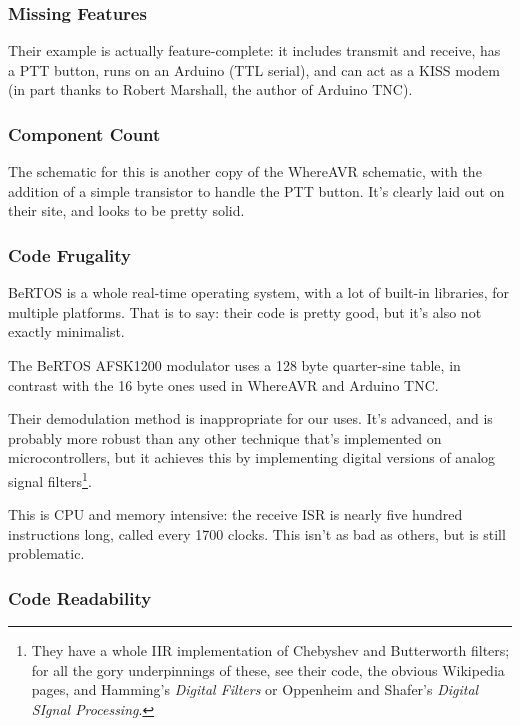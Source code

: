 \documentclass{article}
\begin{document}
\subsubsection{Missing Features}

Their example is actually feature-complete: it includes transmit and
receive, has a PTT button, runs on an Arduino (TTL serial), and can
act as a KISS modem (in part thanks to Robert Marshall, the author of
Arduino TNC).


\subsubsection{Component Count}

The schematic for this is another copy of the WhereAVR schematic, with
the addition of a simple transistor to handle the PTT button.  It's
clearly laid out on their site, and looks to be pretty solid.

\subsubsection{Code Frugality}

BeRTOS is a whole real-time operating system, with a lot of built-in
libraries, for multiple platforms.  That is to say: their code is
pretty good, but it's also not exactly minimalist.

The BeRTOS AFSK1200 modulator uses a 128 byte quarter-sine table, in
contrast with the 16 byte ones used in WhereAVR and Arduino TNC.

Their demodulation method is inappropriate for our uses.
It's advanced, and is probably more robust than any other technique
that's implemented on microcontrollers, but it achieves this by
implementing digital versions of analog signal filters\footnote{They
  have a whole IIR implementation of Chebyshev and Butterworth
  filters; for all the gory underpinnings of these, see their code,
  the obvious Wikipedia pages, and Hamming's \textit{Digital
    Filters}\cite{HammingDigitalFilters} or Oppenheim and Shafer's
  \textit{Digital SIgnal Processing}\cite{OppenhiemSchaferDSP}.}.

This is CPU and memory intensive: the receive ISR is nearly five
hundred instructions long, called every 1700 clocks.  This isn't as
bad as others, but is still problematic.

\subsubsection{Code Readability}
\end{document}
